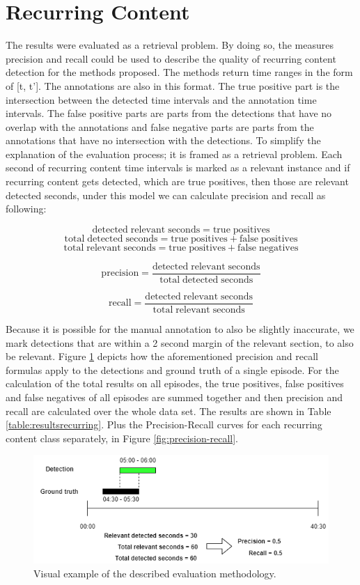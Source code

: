 \documentclass{report}
\begin{document}
\section{Recurring Content}
The results were evaluated as a retrieval problem. By doing so, the measures precision and recall could be used to describe the quality of recurring content detection for the methods proposed. The methods return time ranges in the form of [t, t']. The annotations are also in this format. The true positive part is the intersection between the detected time intervals and the annotation time intervals. The false positive parts are parts from the detections that have no overlap with the annotations and false negative parts are parts from the annotations that have no intersection with the detections. To simplify the explanation of the evaluation process; it is framed as a retrieval problem. Each second of recurring content time intervals is marked as a relevant instance and if recurring content gets detected, which are true positives, then those are relevant detected seconds, under this model we can calculate precision and recall as following:

\[\mathrm{detected\;relevant\;seconds} = \mathrm{true\;positives}\]
\[\mathrm{total\;detected\;seconds = \mathrm{true\;positives} + \mathrm{false\;positives}}\]
\[\mathrm{total\;relevant\;seconds} = \mathrm{true\;positives} + \mathrm{false\;negatives}\]

\[\mathrm{precision} = \frac{\mathrm{detected\;relevant\;seconds}}{\mathrm{total\;detected\;seconds}}\]

\[\mathrm{recall} = \frac{\mathrm{detected\;relevant\;seconds}}{\mathrm{total\;relevant\;seconds}}\]

Because it is possible for the manual annotation to also be slightly inaccurate, we mark detections that are within a 2 second margin of the relevant section, to also be relevant. Figure \ref{fig:evaluation-example} depicts how the aforementioned precision and recall formulas apply to the detections and ground truth of a single episode. For the calculation of the total results on all episodes, the true positives, false positives and false negatives of all episodes are summed together and then precision and recall are calculated over the whole data set. The results are shown in Table \ref{table:resultsrecurring}. Plus the Precision-Recall curves for each recurring content class separately, in Figure \ref{fig:precision-recall}.

\begin{figure}[H]
	\includegraphics[width=\textwidth]{images/evaluation.png}
	\centering
	\caption{Visual example of the described evaluation methodology.}
	\label{fig:evaluation-example}
\end{figure}
\end{document}
